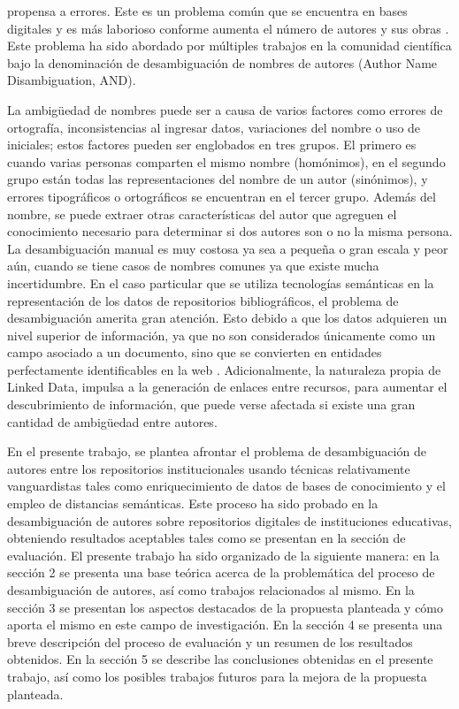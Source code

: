 \documentclass[conference]{IEEEtran}
\begin{document}
propensa a errores. Este es un problema común que se encuentra en bases digitales y es más laborioso conforme aumenta el número de autores y sus obras \cite{Lee:2007:YCC:1323688.1323690}. Este problema ha sido abordado  por múltiples trabajos  en la comunidad científica  bajo la denominación de desambiguación de nombres de autores (Author Name Disambiguation, AND).

La ambigüedad de nombres puede ser a causa de varios factores como errores de ortografía, inconsistencias al ingresar datos, variaciones del nombre o uso de iniciales; estos factores pueden ser englobados en tres grupos. El primero es cuando varias personas comparten el mismo nombre (homónimos), en el segundo grupo están todas las representaciones del nombre de un autor (sinónimos), y errores tipográficos o ortográficos se encuentran en el tercer grupo. Además del nombre, se puede extraer  otras características del autor que agreguen el conocimiento necesario para determinar si dos autores son o no la misma persona. La desambiguación manual es muy costosa ya sea a pequeña o gran escala y  peor aún, cuando se tiene casos de nombres comunes ya que existe mucha incertidumbre. En el caso particular que se utiliza tecnologías semánticas en la representación de los  datos de repositorios bibliográficos, el problema de desambiguación amerita gran atención. Esto debido a que los datos  adquieren un nivel superior de información, ya que no son considerados únicamente como un campo asociado a un documento, sino que se convierten en entidades perfectamente  identificables en la web \cite{bizer2009linked}. Adicionalmente, la naturaleza propia de Linked Data, impulsa a la generación de enlaces entre recursos, para aumentar el descubrimiento de información,   que puede verse afectada si existe una gran cantidad de ambigüedad  entre  autores.

En el presente trabajo, se plantea afrontar el problema de desambiguación de autores entre los repositorios institucionales usando técnicas relativamente vanguardistas tales como enriquecimiento de datos de bases de conocimiento y el empleo de  distancias semánticas. Este proceso ha sido probado en la desambiguación de autores sobre repositorios digitales de instituciones educativas, obteniendo resultados aceptables tales como se presentan en la sección de evaluación. El presente trabajo ha sido organizado de la siguiente manera: en la sección 2 se presenta una base teórica acerca de la problemática del proceso de desambiguación de autores, así como trabajos relacionados al mismo. En la sección 3 se presentan los aspectos destacados de la  propuesta planteada y cómo aporta el mismo en este campo de investigación. En la sección 4  se presenta una breve descripción del proceso de evaluación y un resumen de los resultados obtenidos. En la sección 5 se  describe las conclusiones obtenidas en el presente trabajo, así como los posibles trabajos futuros para la mejora de la propuesta planteada.
\end{document}
